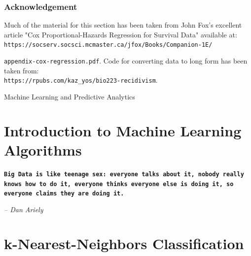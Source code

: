 \documentclass[10pt, letterpaper, twoside]{memoir}\usepackage{knitr}
\makeatletter
\newcommand{\chapterendsymbol}{
    \vspace{24pt}
    \Huge
    \hrulefill \hspace{0.1in} \hspace{0.1in} \hrulefill
    \normalsize
    }
\renewcommand\part{%
  \if@openright
    \cleardoublepage
  \else
    \clearpage
  \fi
  \thispagestyle{empty}
  \null\vfil
  \secdef\@part\@spart
  }
\makeatother
\begin{document}
\subsection{Acknowledgement}

Much of the material for this section has been taken from John Fox's excellent article "Cox Proportional-Hazards Regression for Survival Data" available at:\\ 
\small
\verb|https://socserv.socsci.mcmaster.ca/jfox/Books/Companion-1E/| 

\verb|appendix-cox-regression.pdf|. 
\normalsize
Code for converting data to long form has been taken from: \\ \verb|https://rpubs.com/kaz_yos/bio223-recidivism|. 

\chapterendsymbol




\part{Machine Learning and Predictive Analytics}




\chapter{Introduction to Machine Learning Algorithms}


\begin{flushright}

\textbf{\texttt{Big Data is like teenage sex: everyone talks about it, nobody really knows how to do it, everyone thinks everyone else is doing it, so everyone claims they are doing it.}}

\emph{-- Dan Ariely}

\end{flushright}

\vspace{12pt}

\chapterendsymbol





\chapter{k-Nearest-Neighbors Classification}
\end{document}
